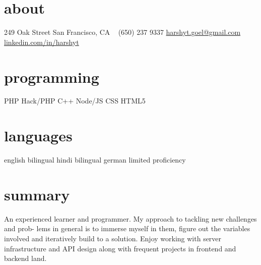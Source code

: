 \documentclass[print]{friggeri-cv} %
\begin{document}


\begin{aside} %
\section{about}
249 Oak Street
San Francisco, CA 
~
(650) 237 9337
\href{mailto:harshyt.goel@gmail.com}{harshyt.goel@gmail.com}
\href{https://www.linkedin.com/in/harshyt}{linkedin.com/in/harshyt}
\section{programming}
PHP
Hack/PHP
C++
Node/JS
CSS
HTML5
\section{languages}
english bilingual
hindi bilingual
german limited proficiency
\end{aside}

\section{summary}
An experienced learner and programmer. My approach to tackling new challenges and prob- lems in general is to immerse myself in them, figure out the variables involved and iteratively build to a solution. Enjoy working with server infrastructure and API design along with frequent projects in frontend and backend land.

\end{document}
